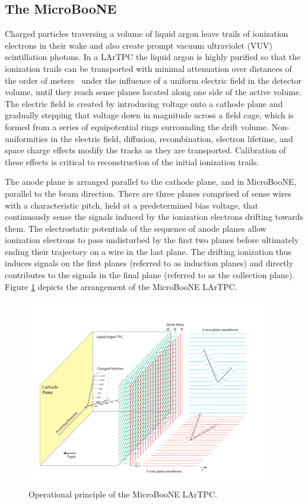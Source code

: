 \subsection{The MicroBooNE \lartpc}

Charged particles traversing a volume of liquid argon leave trails of ionization electrons in their wake and also create prompt vacuum ultraviolet (VUV) scintillation photons.  In a LArTPC the liquid argon is highly purified so that the ionization trails can be transported with minimal attenuation over distances of the order of meters~\cite{Aprile:1985} under the influence of a uniform electric field in the detector volume, until they reach sense planes located along one side of the active volume.   The electric field is created by introducing voltage onto a cathode plane and gradually stepping that voltage down in magnitude across a field cage, which is formed from a series of equipotential rings surrounding the drift volume.   Non-uniformities in the electric field, diffusion, recombination, electron lifetime, and space charge effects modify the tracks as they are transported.  Calibration of these effects is critical to reconstruction of the initial ionization trails.   

The anode plane is arranged parallel to the cathode plane, and in MicroBooNE, parallel to the beam direction.   There are three planes comprised of sense wires with a characteristic pitch, held at a predetermined bias voltage, that continuously sense the signals induced by the ionization electrons drifting towards them. The electrostatic potentials of the sequence of anode planes allow ionization electrons to pass undisturbed by the first two planes before ultimately ending their trajectory on a wire in the last plane. The drifting ionization thus induces signals on the first planes (referred to as induction planes) and directly contributes to the signals in the final plane (referred to as the collection plane).  Figure \ref{fig:lartpc} depicts the arrangement of the MicroBooNE LArTPC.


\begin{figure}
\centering 
\includegraphics[width=0.95\textwidth]{figures/LArTPC_Concept}
\caption{Operational principle of the MicroBooNE LArTPC.}
\label{fig:lartpc}
\end{figure}


